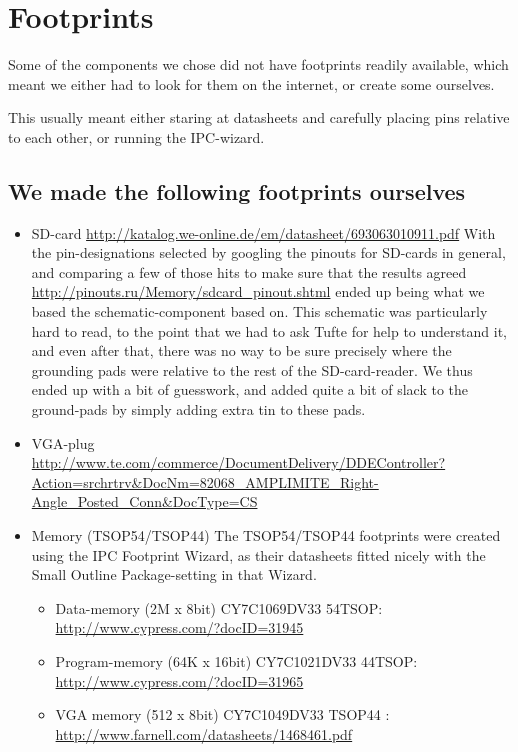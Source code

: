 \section {Footprints}
Some of the components we chose did not have footprints readily available, which
meant we either had to look for them on the internet, or create some ourselves.

This usually meant either staring at datasheets and carefully placing pins
relative to each other, or running the IPC-wizard.

\subsection {We made the following footprints ourselves}
\begin {itemize}
\item SD-card \url{http://katalog.we-online.de/em/datasheet/693063010911.pdf}
  With the pin-designations selected by googling the pinouts for SD-cards in
  general, and comparing a few of those hits to make sure that the results
  agreed \url{http://pinouts.ru/Memory/sdcard_pinout.shtml} ended up being what
  we based the schematic-component based on. This schematic was particularly hard
  to read, to the point that we had to ask Tufte for help to understand it, and even
  after that, there was no way to be sure precisely where the grounding pads were relative
  to the rest of the SD-card-reader. We thus ended up with a bit of guesswork, and added
  quite a bit of slack to the ground-pads by simply adding extra tin to these pads.
\item VGA-plug \url{http://www.te.com/commerce/DocumentDelivery/DDEController?Action=srchrtrv&DocNm=82068_AMPLIMITE_Right-Angle_Posted_Conn&DocType=CS}
\item Memory (TSOP54/TSOP44)
The TSOP54/TSOP44 footprints were created using the IPC Footprint Wizard, as
their datasheets fitted nicely with the Small Outline Package-setting in that
Wizard.

\begin {itemize}
\item Data-memory (2M x 8bit) CY7C1069DV33 54TSOP:
\url{http://www.cypress.com/?docID=31945} 
\item Program-memory (64K x 16bit)
CY7C1021DV33 44TSOP: \url{http://www.cypress.com/?docID=31965} 
\item VGA memory (512 x 8bit) CY7C1049DV33 TSOP44 : \url{http://www.farnell.com/datasheets/1468461.pdf}
\end {itemize}
\end {itemize}

